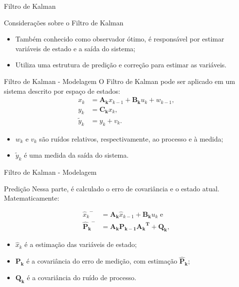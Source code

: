 \documentclass[10pt]{beamer}
\begin{document}
\begin{frame}[fragile]{Filtro de Kalman}
\begin{block}{Considerações sobre o Filtro de Kalman}
\begin{itemize}
\item Também conhecido como observador ótimo, é responsável por estimar variáveis de estado e a saída do sistema;
\item Utiliza uma estrutura de predição e correção para estimar as variáveis.
\end{itemize}
\end{block}
\end{frame}

\begin{frame}[fragile]{Filtro de Kalman - Modelagem}
O Filtro de Kalman pode ser aplicado em um sistema descrito por espaço de estados:
\begin{align}
\label{KalmanEq1}
	x_k &= \mathbf{A_k} x_{k-1} + \mathbf{B_k} u_k + w_{k-1}, \\
	\label{KalmanEq2}
	y_k &= \mathbf{C_k} x_k, \\
	\label{KalmanEq3}
	\tilde{y}_k &= y_k + v_k.
\end{align}
\begin{itemize}
\item $w_k$ e $v_k$ são ruídos relativos, respectivamente, ao processo e à medida;
\item $\tilde{y}_k$ é uma medida da saída do sistema.
\end{itemize}
\end{frame}

\begin{frame}[fragile]{Filtro de Kalman - Modelagem}
\begin{block}{Predição}
Nessa parte, é calculado o erro de covariância e o estado atual. Matematicamente:

\begin{align}
\label{KalmanEq4} {\hat{x}_{k}}^{-} &= \mathbf{A_k} \hat{x}_{k-1} + \mathbf{B_k} u_k\;\mathrm{e} \\
	\label{KalmanEq5} \mathbf{{\hat{P}_{k}}^{-}} &= \mathbf{A_k}\mathbf{P_{k-1}}\mathbf{{A_k}^T} + \mathbf{Q_k},
\end{align}

\begin{itemize}
\item $\hat{x}_{k}$ é a estimação das variáveis de estado;
\item $\mathbf{P_k}$ é a covariância do erro de medição, com estimação $\mathbf{{\hat{P}_{k}}}$;
\item $\mathbf{Q_k}$ é a covariância do ruído de processo.
\end{itemize}

\end{block}

\end{frame}
\end{document}
